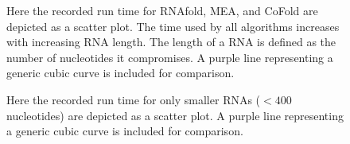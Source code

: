 \documentclass[12pt, a4paper]{article}
\begin{document}
\begin{figure}
\begin{center}
\end{center}
\caption{Here the recorded run time for RNAfold, MEA, and CoFold are depicted as a scatter plot. The time used by all algorithms increases with increasing RNA length. The length of a RNA is defined as the number of nucleotides it compromises. A purple line representing a generic cubic curve is included for comparison.}
\label{fig:timegraph}
\end{figure}


\begin{figure}
\begin{center}
\end{center}
\caption{Here the recorded run time for only smaller RNAs ($< 400$ nucleotides) are depicted as a scatter plot. A purple line representing a generic cubic curve is included for comparison.}
\label{fig:timegraphsmall}
\end{figure}
\end{document}
